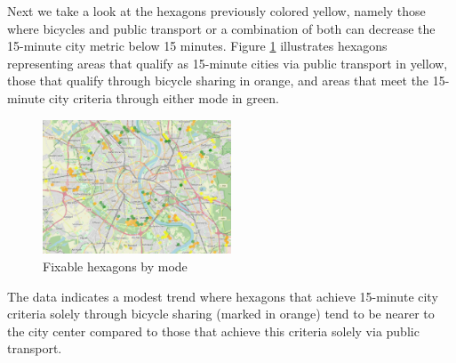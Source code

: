 Next we take a look at the hexagons previously colored yellow, namely those where bicycles and public transport or a combination of both can decrease the 15-minute city metric below 15 minutes.
Figure \ref{fig:fixable_hexagons} illustrates hexagons representing areas that qualify as 15-minute cities via public transport in yellow, those that qualify through bicycle sharing in orange, and areas that meet the 15-minute city criteria through either mode in green.
\begin{figure}
  \begin{center}
    \includegraphics[width=0.50\textwidth]{Figures/results/problematic_hexagons/fixable_hexagons}
  \end{center}
  \caption{Fixable hexagons by mode}
  \label{fig:fixable_hexagons}
\end{figure}
The data indicates a modest trend where hexagons that achieve 15-minute city criteria solely through bicycle sharing (marked in orange) tend to be nearer to the city center compared to those that achieve this criteria solely via public transport.

